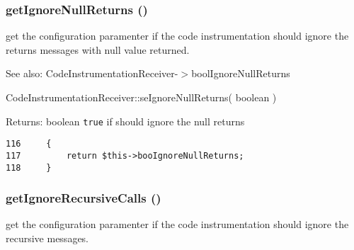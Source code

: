 \hypertarget{class_code_instrumentation_receiver_c9ab1942c4647d400e7af7145f29faf7}{
\subsubsection[{getIgnoreNullReturns}]{\setlength{\rightskip}{0pt plus 5cm}getIgnoreNullReturns ()}}
\label{class_code_instrumentation_receiver_c9ab1942c4647d400e7af7145f29faf7}


get the configuration paramenter if the code instrumentation should ignore the returns messages with null value returned.

\begin{Desc}
\item[See also:]CodeInstrumentationReceiver-$>$boolIgnoreNullReturns 

CodeInstrumentationReceiver::seIgnoreNullReturns( boolean ) \end{Desc}
\begin{Desc}
\item[Returns:]boolean {\tt true} if should ignore the null returns \end{Desc}


\begin{Code}\begin{verbatim}116     {
117         return $this->booIgnoreNullReturns;
118     }
\end{verbatim}
\end{Code}


\hypertarget{class_code_instrumentation_receiver_9827f39df527b013a3d967215cac31d1}{
\subsubsection[{getIgnoreRecursiveCalls}]{\setlength{\rightskip}{0pt plus 5cm}getIgnoreRecursiveCalls ()}}
\label{class_code_instrumentation_receiver_9827f39df527b013a3d967215cac31d1}


get the configuration paramenter if the code instrumentation should ignore the recursive messages.

